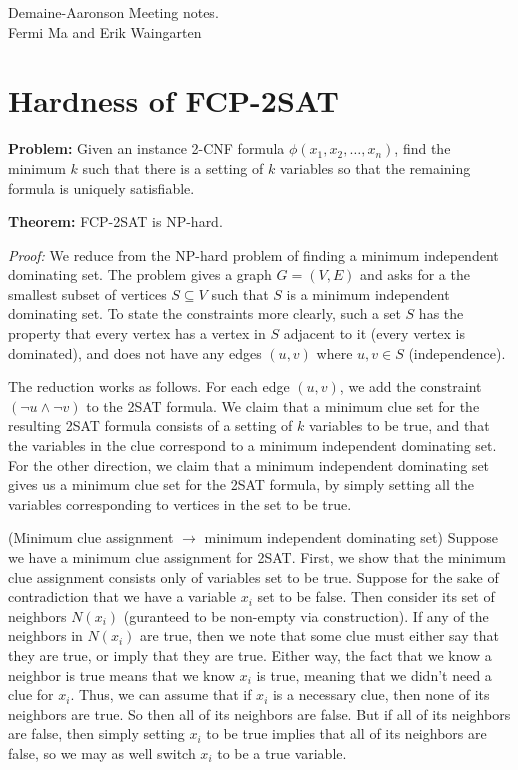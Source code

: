 \documentclass[11pt]{article}
\begin{document}
\begin{center} \Large
{Demaine-Aaronson Meeting notes. } \\[1ex]
{Fermi Ma and Erik Waingarten}
\end{center}

\section{Hardness of FCP-2SAT}

\textbf{Problem:} Given an instance 2-CNF formula $\phi(x_1,x_2,\dots,x_n)$, find the minimum $k$ such that there is a setting of $k$ variables so that the remaining formula is uniquely satisfiable.

\textbf{Theorem:} FCP-2SAT is NP-hard.

\emph{Proof:} We reduce from the NP-hard problem of finding a minimum independent dominating set. The problem gives a graph $G = (V,E)$ and asks for a the smallest subset of vertices $S \subseteq V$ such that $S$ is a minimum independent dominating set. To state the constraints more clearly, such a set $S$ has the property that every vertex has a vertex in $S$ adjacent to it (every vertex is dominated), and does not have any edges $(u,v)$ where $u,v \in S$ (independence).

The reduction works as follows. For each edge $(u,v)$, we add the constraint $(\neg u \wedge \neg v)$ to the 2SAT formula. We claim that a minimum clue set for the resulting 2SAT formula consists of a setting of $k$ variables to be true, and that the variables in the clue correspond to a minimum independent dominating set. For the other direction, we claim that a minimum independent dominating set gives us a minimum clue set for the 2SAT formula, by simply setting all the variables corresponding to vertices in the set to be true.

(Minimum clue assignment $\to$ minimum independent dominating set) Suppose we have a minimum clue assignment for 2SAT. First, we show that the minimum clue assignment consists only of variables set to be true. Suppose for the sake of contradiction that we have a variable $x_i$ set to be false. Then consider its set  of neighbors $N(x_i)$ (guranteed to be non-empty via construction). If any of the neighbors in $N(x_i)$ are true, then we note that some clue must either say that they are true, or imply that they are true. Either way, the fact that we know a neighbor is true means that we know $x_i$ is true, meaning that we didn't need a clue for $x_i$. Thus, we can assume that if $x_i$ is a necessary clue, then none of its neighbors are true. So then all of its neighbors are false. But if all of its neighbors are false, then simply setting $x_i$ to be true implies that all of its neighbors are false, so we may as well switch $x_i$ to be a true variable. 
\end{document}
